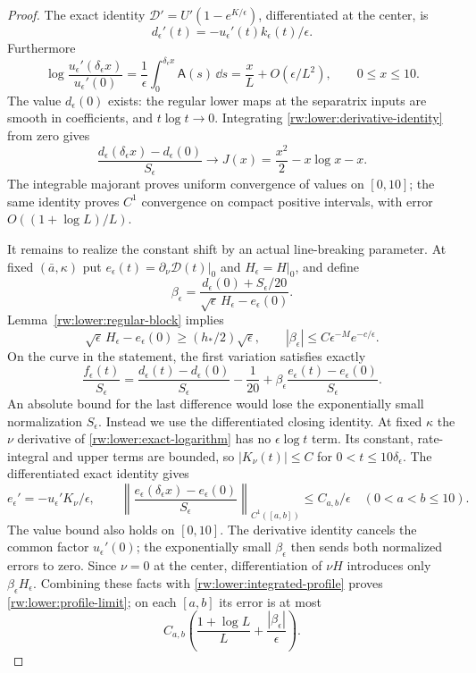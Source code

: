 \begin{proof}
The exact identity
$\mathscr D'=U'(1-e^{K/\epsilon})$, differentiated at the center,
is
\begin{equation}\label{rw:lower:derivative-identity}
 d_\epsilon'(t)=-u_\epsilon'(t)k_\epsilon(t)/\epsilon.
\end{equation}
Furthermore
\[
 \log\frac{u_\epsilon'(\delta_\epsilon x)}{u_\epsilon'(0)}
 =\frac1\epsilon\int_0^{\delta_\epsilon x}\mathsf A(s)\,\dd s
 =\frac{x}{L}+O(\epsilon/L^2),\qquad 0\le x\le10.
\]
The value $d_\epsilon(0)$ exists: the regular lower maps at the
separatrix inputs are smooth in coefficients, and $t\log t\to0$.
Integrating \eqref{rw:lower:derivative-identity} from zero gives
\begin{equation}\label{rw:lower:integrated-profile}
 \frac{d_\epsilon(\delta_\epsilon x)-d_\epsilon(0)}{S_\epsilon}
 \longrightarrow J(x)=\frac{x^2}{2}-x\log x-x.
\end{equation}
The integrable majorant proves uniform convergence of values on
$[0,10]$; the same identity proves $C^1$ convergence on compact
positive intervals, with error $O((1+\log L)/L)$.

It remains to realize the constant shift by an actual line-breaking
parameter. At fixed $(\bar a,\kappa)$ put
$e_\epsilon(t)=\partial_\nu\mathscr D(t)|_0$ and $H_\epsilon=H|_0$,
and define
\begin{equation}\label{rw:lower:line-breaking-direction}
 \beta_\epsilon=
  \frac{d_\epsilon(0)+S_\epsilon/20}
       {\sqrt\epsilon\,H_\epsilon-e_\epsilon(0)}.
\end{equation}
Lemma~\ref{rw:lower:regular-block} implies
\[
 \sqrt\epsilon\,H_\epsilon-e_\epsilon(0)
       \ge (h_*/2)\sqrt\epsilon,\qquad
 |\beta_\epsilon|\le C\epsilon^{-M}e^{-c/\epsilon}.
\]
On the curve in the statement, the first variation satisfies exactly
\[
 \frac{f_\epsilon(t)}{S_\epsilon}
 =\frac{d_\epsilon(t)-d_\epsilon(0)}{S_\epsilon}-\frac1{20}
       +\beta_\epsilon
          \frac{e_\epsilon(t)-e_\epsilon(0)}{S_\epsilon}.
\]
An absolute bound for the last difference would lose the exponentially
small normalization $S_\epsilon$. Instead we use the differentiated
closing identity. At fixed $\kappa$ the $\nu$ derivative of
\eqref{rw:lower:exact-logarithm} has no $\epsilon\log t$ term.
Its constant, rate-integral and upper terms are bounded, so
$|K_\nu(t)|\le C$ for $0<t\le10\delta_\epsilon$.
The differentiated exact identity gives
\[
 e_\epsilon'=-u_\epsilon'K_\nu/\epsilon,\qquad
 \left\|\frac{e_\epsilon(\delta_\epsilon x)-e_\epsilon(0)}
                    {S_\epsilon}\right\|_{C^1([a,b])}
       \le C_{a,b}/\epsilon
 \quad(0<a<b\le10).
\]
The value bound also holds on $[0,10]$. The derivative identity
cancels the common factor $u_\epsilon'(0)$; the exponentially small
$\beta_\epsilon$ then sends both normalized errors to zero.
Since $\nu=0$ at the center, differentiation of $\nu H$ introduces
only $\beta_\epsilon H_\epsilon$.
Combining these facts with \eqref{rw:lower:integrated-profile}
proves \eqref{rw:lower:profile-limit}; on each $[a,b]$ its error is
at most
\[
 C_{a,b}\left(\frac{1+\log L}{L}
                     +\frac{|\beta_\epsilon|}{\epsilon}\right).
\]
\end{proof}

